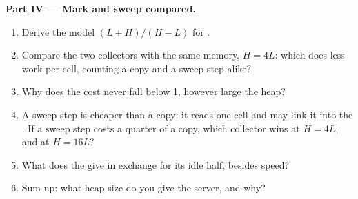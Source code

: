 \begin{problem}
\medskip\noindent\textbf{Part IV --- Mark and sweep compared.}
\begin{enumerate}[resume]
\item Derive the model $(L + H)/(H - L)$ for .
\item Compare the two collectors with the same memory, $H = 4L$: which does less work per cell, counting a copy and a sweep step alike?
\item Why does the  cost never fall below 1, however large the heap?
\item A sweep step is cheaper than a copy: it reads one cell and may link it into the . If a sweep step costs a quarter of a copy, which collector wins at $H = 4L$, and at $H = 16L$?
\item What does the  give in exchange for its idle half, besides speed?
\item Sum up: what heap size do you give the server, and why?
\end{enumerate}
\end{problem}
